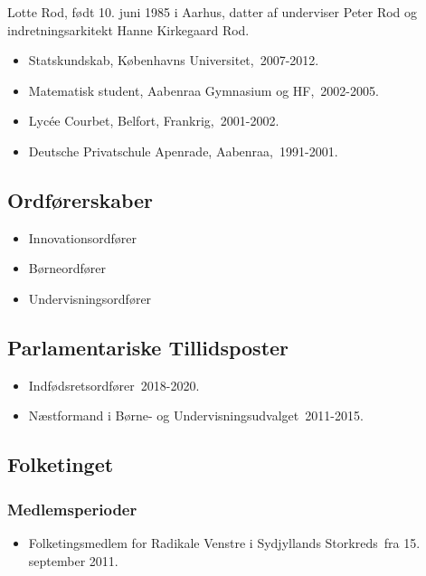 \documentclass[11pt, a4paper]{awesome-cv}
\begin{document}
\makecvheader[R]
\makelettertitle
\begin{cvletter}
Lotte Rod, født 10. juni 1985 i Aarhus, datter af underviser Peter Rod og indretningsarkitekt Hanne Kirkegaard Rod.

\begin{itemize}
\item Statskundskab, Københavns Universitet, 2007-2012.
\item Matematisk student, Aabenraa Gymnasium og HF, 2002-2005.
\item Lycée Courbet, Belfort, Frankrig, 2001-2002.
\item Deutsche Privatschule Apenrade, Aabenraa, 1991-2001.
\end{itemize}
\subsection*{Ordførerskaber}
\begin{itemize}
\item Innovationsordfører
\item Børneordfører
\item Undervisningsordfører
\end{itemize}
\subsection*{Parlamentariske Tillidsposter}
\begin{itemize}
\item Indfødsretsordfører 2018-2020.
\item Næstformand i Børne- og Undervisningsudvalget 2011-2015.
\end{itemize}
\subsection*{Folketinget}
\subsubsection*{Medlemsperioder}
\begin{itemize}
\item Folketingsmedlem for Radikale Venstre i Sydjyllands Storkreds fra 15. september 2011.
\end{itemize}

\end{cvletter}
\end{document}
